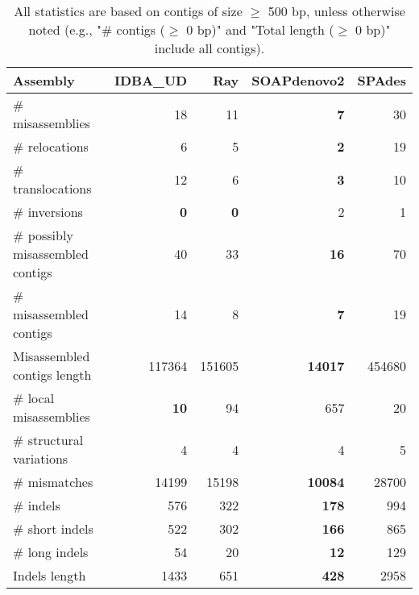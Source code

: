 \documentclass[12pt,a4paper]{article}
\begin{document}
\begin{table}[ht]
\begin{center}
\caption{All statistics are based on contigs of size $\geq$ 500 bp, unless otherwise noted (e.g., "\# contigs ($\geq$ 0 bp)" and "Total length ($\geq$ 0 bp)" include all contigs).}
\begin{tabular}{|l*{4}{|r}|}
\hline
Assembly & IDBA\_UD & Ray & SOAPdenovo2 & SPAdes \\ \hline
\# misassemblies & 18 & 11 & {\bf 7} & 30 \\ \hline
\hspace{5mm}\# relocations & 6 & 5 & {\bf 2} & 19 \\ \hline
\hspace{5mm}\# translocations & 12 & 6 & {\bf 3} & 10 \\ \hline
\hspace{5mm}\# inversions & {\bf 0} & {\bf 0} & 2 & 1 \\ \hline
\# possibly misassembled contigs & 40 & 33 & {\bf 16} & 70 \\ \hline
\# misassembled contigs & 14 & 8 & {\bf 7} & 19 \\ \hline
Misassembled contigs length & 117364 & 151605 & {\bf 14017} & 454680 \\ \hline
\# local misassemblies & {\bf 10} & 94 & 657 & 20 \\ \hline
\# structural variations & 4 & 4 & 4 & 5 \\ \hline
\# mismatches & 14199 & 15198 & {\bf 10084} & 28700 \\ \hline
\# indels & 576 & 322 & {\bf 178} & 994 \\ \hline
\hspace{5mm}\# short indels & 522 & 302 & {\bf 166} & 865 \\ \hline
\hspace{5mm}\# long indels & 54 & 20 & {\bf 12} & 129 \\ \hline
Indels length & 1433 & 651 & {\bf 428} & 2958 \\ \hline
\end{tabular}
\end{center}
\end{table}
\end{document}
